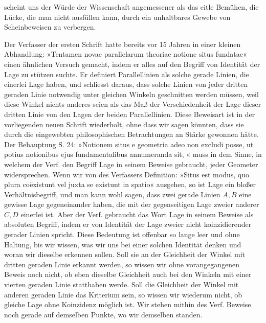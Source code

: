 scheint uns der Würde der Wissenschaft angemessener als das eitle
Bemühen, die Lücke, die man nicht ausfüllen kann, durch ein unhaltbares Gewebe
von Scheinbeweisen zu verbergen.

Der Verfasser der ersten Schrift hatte bereits vor 15 Jahren in einer kleinen
Abhandlung: »Tentamen novae parallelarum theoriae notione situs fundatae«
einen ähnlichen Versuch gemacht, indem er alles auf den Begriff von Identität
der Lage zu stützen suchte. Er definiert Parallellinien als solche
gerade Linien, die einerlei Lage haben, und schliesst daraus, dass solche Linien
von jeder dritten geraden Linie notwendig unter gleichen
Winkeln geschnitten werden müssen, weil diese Winkel nichts anderes
  seien als das Maß der Verschiedenheit der Lage dieser dritten Linie von den
Lagen der beiden Parallellinien. Diese Beweisart ist in der vorliegenden neuen
Schrift wiederholt, ohne dass wir sagen könnten, dass sie durch die
eingewebten philosophischen Betrachtungen an Stärke gewonnen hätte. Der
Behauptung S. 24: »Notionem situs e geometria adeo non excludi posse, ut potius
notionibus ejus fundamentalibus annumeranda sit, « muss in dem Sinne, in welchem der Verf. den Begriff Lage in seinem
Beweise gebraucht, jeder Geometer widersprechen. Wenn wir von des
Verfassers Definition: »Situs est modus, quo plura coëxistunt vel juxta se
existunt in spatio« ausgehen, so ist Lage ein bloßer Verhältnisbegriff, und man
kann wohl sagen, dass zwei gerade Linien $A,B$ eine gewisse Lage gegeneinander
haben, die mit der gegenseitigen Lage zweier anderer $C,D$ einerlei ist. Aber der
Verf. gebraucht das Wort Lage in seinem Beweise als absoluten Begriff, indem er
von Identität der Lage zweier nicht koinzidierender gerader Linien spricht. Diese
Bedeutung ist offenbar so lange leer und ohne Haltung, bis wir wissen, was wir
uns bei einer solchen Identität denken und woran wir dieselbe erkennen
sollen. Soll sie an der Gleichheit der Winkel mit  dritten
geraden Linie erkannt werden, so wissen wir ohne vorangegangenen Beweis noch
nicht, ob eben dieselbe Gleichheit auch bei den Winkeln mit einer vierten geraden
Linie statthaben werde. Soll die Gleichheit der Winkel mit  anderen geraden Linie das Kriterium sein, so wissen wir wiederum nicht, ob
gleiche Lage ohne Koinzidenz möglich ist. Wir stehen mithin
 des Verf. Beweise noch gerade auf demselben Punkte, wo wir
 demselben standen.

